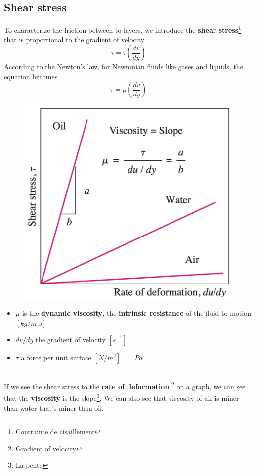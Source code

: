 \subsection{Shear stress}
To characterize the friction between to layers, we introduce the \textbf{shear stress}\footnote{Contrainte de cisaillement} that is proportional to the gradient of velocity
\begin{equation}
	\tau = \tau \left( \frac{dv}{dy} \right)
\end{equation}
According to the Newton's law, for Newtonian fluids like gases and liquids, the equation becomes
\begin{equation}
	\tau = \mu \left( \frac{dv}{dy} \right)
\end{equation}
\begin{figure}
	\includegraphics[scale=0.26]{ch1/5}
\end{figure}
\begin{itemize}
	\item $\mu$ is the \textbf{dynamic viscosity}, the \textbf{intrinsic resistance} of the fluid to motion $[kg/m.s]$
	\item $dv/dy$ the gradient of velocity $[s^{-1}]$
	\item $\tau$ a force per unit surface $[N/m^2] = [Pa]$
\end{itemize}
\ \\
If we see the shear stress to the \textbf{rate of deformation} \footnote{Gradient of velocity} on a graph, we can see that the \textbf{viscosity} is the slope\footnote{La pente}. We can also see that viscosity of air is miner than water that's miner than oil. 
	
